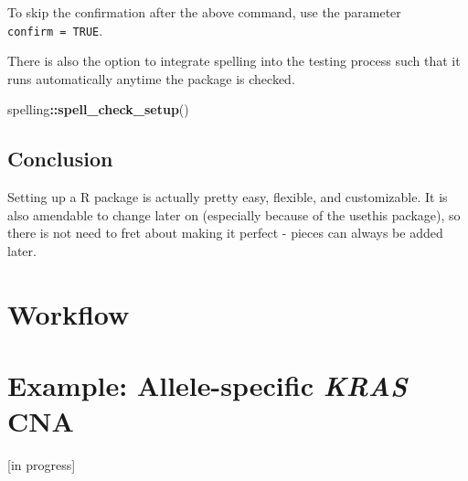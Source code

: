\documentclass[]{book}
\newenvironment{Shaded}{\begin{snugshade}}{\end{snugshade}}
\newcommand{\KeywordTok}[1]{\textcolor[rgb]{0.13,0.29,0.53}{\textbf{#1}}}
\newcommand{\OperatorTok}[1]{\textcolor[rgb]{0.81,0.36,0.00}{\textbf{#1}}}
\newcommand{\NormalTok}[1]{#1}
\begin{document}
To skip the confirmation after the above command, use the parameter
\texttt{confirm\ =\ TRUE}.

There is also the option to integrate spelling into the testing process
such that it runs automatically anytime the package is checked.

\begin{Shaded}
\begin{Highlighting}[]
\NormalTok{spelling}\OperatorTok{::}\KeywordTok{spell_check_setup}\NormalTok{()}
\end{Highlighting}
\end{Shaded}

\section{Conclusion}\label{conclusion}

Setting up a R package is actually pretty easy, flexible, and
customizable. It is also amendable to change later on (especially
because of the usethis package), so there is not need to fret about
making it perfect - pieces can always be added later.

\chapter{Workflow}\label{workflow}

\chapter{\texorpdfstring{Example: Allele-specific \emph{KRAS}
CNA}{Example: Allele-specific KRAS CNA}}\label{example-allele-specific-kras-cna}

{[}in progress{]}


\end{document}
